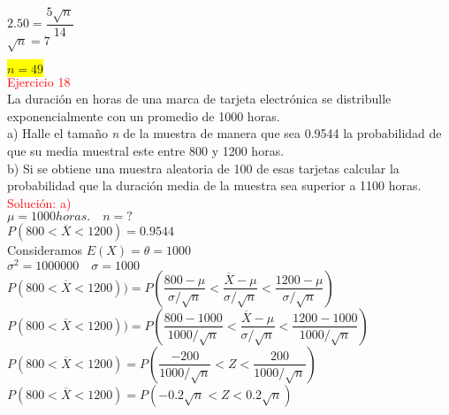 \documentclass[DIV=calc,paper=a4,fontsize=11pt,openany]{book}
\begin{document}
$2.50 = \dfrac{5\sqrt{\textit{n}}}{14}$\\

$\sqrt{\textit{n}} = 7$

\colorbox{yellow}{$\textit{n} = 49$}\\






\textcolor{red}{Ejercicio 18}\\

La duración en horas de una marca de tarjeta electrónica  se distribulle exponencialmente con un promedio de 1000 horas.\\

a) Halle el tamaño \textit{n} de la muestra de manera que sea 0.9544 la probabilidad de que su media muestral este entre 800 y 1200 horas.\\

b) Si se obtiene una muestra aleatoria de 100 de esas tarjetas calcular la probabilidad que la duración media de la muestra sea superior a 1100 horas.\\


\textcolor{red}{Solución: a)}\\

$\mu = 1000 horas. \quad \textit{n} = ?$\\

$\textit{P}(800 < \overline{X} < 1200) = 0.9544$\\

Consideramos $\textit{E}(X) = \theta = 1000$\\

$\sigma^{2} = 1 000 000 \quad \sigma = 1000$\\

$\textit{P}(800 < \overline{X} < 1200)) = \textit{P}(\dfrac{800 - \mu}{\sigma/\sqrt{\textit{n}}} < \dfrac{\overline{X} - \mu}{\sigma/\sqrt{\textit{n}}} < \dfrac{1200 - \mu}{\sigma/\sqrt{\textit{n}}})$\\

$\textit{P}(800 < \overline{X} < 1200)) = \textit{P}(\dfrac{800 - 1000}{1000/\sqrt{\textit{n}}} < \dfrac{\overline{X} - \mu}{\sigma/\sqrt{\textit{n}}} < \dfrac{1200 - 1000}{1000/\sqrt{\textit{n}}})$\\

$\textit{P}(800 < \overline{X} < 1200) = \textit{P}(\dfrac{-200}{1000/\sqrt{\textit{n}}} < \textit{Z} < \dfrac{200}{1000/\sqrt{\textit{n}}})$\\

$\textit{P}(800 < \overline{X} < 1200) = \textit{P}(-0.2\sqrt{\textit{n}} < \textit{Z} < 0.2\sqrt{\textit{n}})$\\
\end{document}
